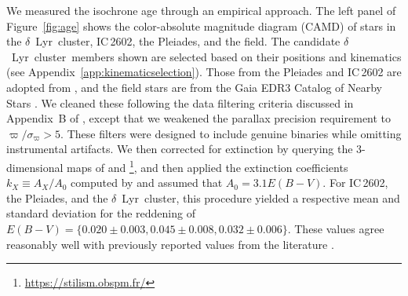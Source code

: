 \documentclass[12pt,modern,twocolumn,tighten]{aastex63}
\newcommand{\cn}{$\delta$\ Lyr\ cluster} %
\begin{document}
We measured the isochrone age through an empirical approach.  The left
panel of Figure~\ref{fig:age} shows the color-absolute magnitude
diagram (CAMD) of stars in the \cn, IC\,2602, the Pleiades, and the
field.  The candidate \cn\ members shown are selected based on their
positions and kinematics (see Appendix~\ref{app:kinematicselection}).
Those from the Pleiades and IC\,2602 are adopted from
\citet{cantatgaudin_gaia_2018}, and the field stars are from the Gaia
EDR3 Catalog of Nearby Stars \citep{gaia_gcns_2021}.  We cleaned these
following the data filtering criteria discussed in Appendix~B of
\citet{GaiaCollaboration2018}, except that we weakened the parallax
precision requirement to $\varpi/\sigma_\varpi>5$.  These filters were
designed to include genuine binaries while omitting instrumental
artifacts.  We then corrected for extinction by querying the
3-dimensional maps of \citet{capitanio_threedimensional_2017} and
\citet{lallement_threedimensional_2018}\footnote{\url{https://stilism.obspm.fr/}},
and then applied the extinction coefficients $k_X\equiv A_X/A_0$
computed by \citet{GaiaCollaboration2018} and assumed that $A_0 = 3.1
E(B-V)$.  For IC\,2602, the Pleiades, and the \cn, this procedure
yielded a respective mean and standard deviation for the reddening of
$E(B-V)=\{0.020\pm0.003, 0.045\pm0.008, 0.032\pm0.006\}$.  These
values agree reasonably well with previously reported values from the
literature \citep[{\it
e.g.},][]{GaiaCollaboration2018,kounkel_untangling_2019,bossini_age_2019}.

%
%
%
\end{document}
